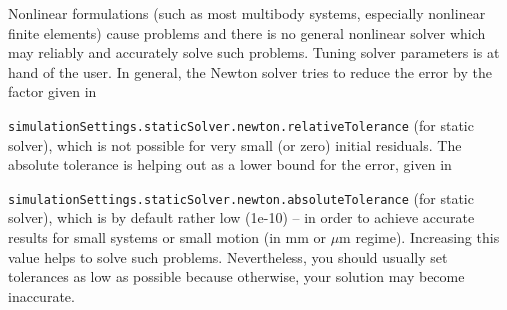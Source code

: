 Nonlinear formulations (such as most multibody systems, especially nonlinear finite elements) cause problems and there is no general nonlinear solver which may reliably and accurately solve such problems.
Tuning solver parameters is at hand of the user. 
In general, the Newton solver tries to reduce the error by the factor given in 
\bi
  \item \texttt{simulationSettings.staticSolver.newton.relativeTolerance} (for static solver), 
\ei
which is not possible for very small (or zero) initial residuals. The absolute tolerance is helping out as a lower bound for the error, given in
\bi
  \item \texttt{simulationSettings.staticSolver.newton.absoluteTolerance} (for static solver),
\ei
which is by default rather low (1e-10) -- in order to achieve accurate results for small systems or small motion (in mm or $\mu$m regime). Increasing this value helps to solve such problems. Nevertheless, you should usually set tolerances as low as possible because otherwise, your solution may become inaccurate.

